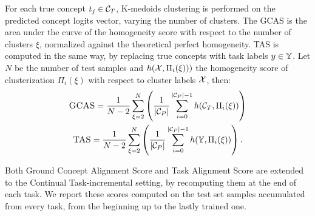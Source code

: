 For each true concept $t_j \in {\mathcal{C}}_T$, K-medoids clustering is performed on the predicted concept logits vector, varying the number of clusters. The GCAS is the area under the curve of the homogeneity score with respect to the number of clusters $\xi$, normalized against the theoretical perfect homogeneity.
TAS is computed in the same way, by replacing true concepts with task labels $y \in {\mathbb{Y}}$.
Let $N$ be the number of test samples and $h({\mathcal{X}}, \Pi_i(\xi)))$ the homogeneity score of clusterization $\Pi_i(\xi)$ with respect to cluster labels ${\mathcal{X}}$, then:
\begin{gather*}
	\textsc{GCAS} = \frac{1}{N - 2} \sum\limits_{\xi = 2}^{N} \left(\frac{1}{|{\mathcal{C}}_P|} \sum\limits_{i = 0}^{|{\mathcal{C}}_P| - 1} h({\mathcal{C}}_T, \Pi_i(\xi))\right)\\
	\textsc{TAS} = \frac{1}{N - 2} \sum\limits_{\xi = 2}^{N} \left(\frac{1}{|{\mathcal{C}}_P|} \sum\limits_{i = 0}^{|{\mathcal{C}}_P| - 1} h({\mathbb{Y}}, \Pi_i(\xi))\right).
\end{gather*}
%

Both {\sc\small Ground Concept Alignment Score} and {\sc\small Task Alignment Score} are extended to the Continual Task-incremental setting, by recomputing them at the end of each task. We report these scores computed on the test set samples accumulated from every task, from the beginning up to the lastly trained one.

